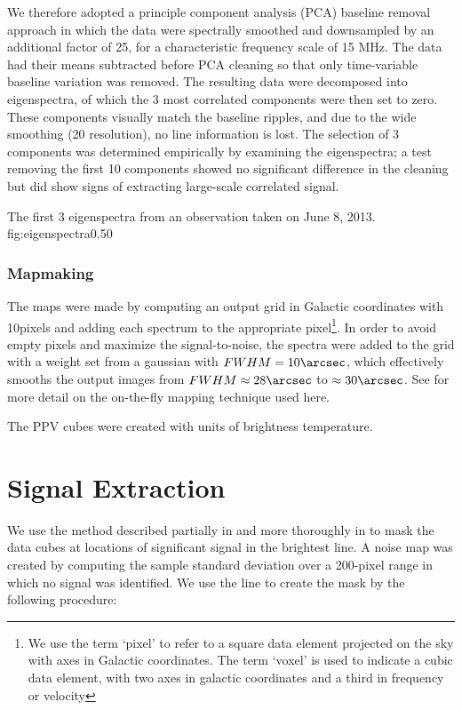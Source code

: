 We therefore adopted a principle component analysis (PCA) baseline removal
approach in which the data were spectrally smoothed and downsampled by an
additional factor of 25, for a characteristic frequency scale of 15 MHz.  The
data had their means subtracted before PCA cleaning so that only time-variable
baseline variation was removed.  The resulting data were decomposed into
eigenspectra, of which the 3 most correlated components were then set to zero.
These components visually match the baseline ripples, and due to the wide
smoothing (20 \kms resolution), no line information is lost.  The selection of
3 components was determined empirically by examining the eigenspectra; a test
removing the first 10 components showed no significant difference in the
cleaning but did show signs of extracting large-scale correlated signal.

{The first 3 eigenspectra from an observation taken on June 8, 2013. }
{fig:eigenspectra}{0.5}{0}


\subsubsection{Mapmaking}
The maps were made by computing an output grid in Galactic coordinates with
10\arcsec pixels and adding each spectrum to the appropriate pixel\footnote{We
use the term `pixel' to refer to a square data element projected on the sky
with axes in Galactic coordinates.  The term `voxel' is used to indicate a cubic data
element, with two axes in galactic coordinates and a third in frequency or
velocity}.  In order
to avoid empty pixels and maximize the signal-to-noise, the spectra were added
to the grid with a weight set from a gaussian with $FWHM=10\arcsec$, which
effectively smooths the output images from $FWHM\approx28\arcsec$ to
$\approx30\arcsec$.  See \citet{Mangum2007a} for more detail on the on-the-fly
mapping technique used here.


The PPV cubes were created with units of brightness temperature.  


\section{Signal Extraction}
We use the method described partially in \citet{Ao2013a} and more thoroughly in
\citet{Dame2011b} to mask the data cubes at locations of significant signal in 
the brightest line. 
A noise map was created by computing the sample standard deviation over a
200-pixel range in which no signal was identified.
We use the \formaldehyde \threeohthree line to create the mask by
the following procedure:

